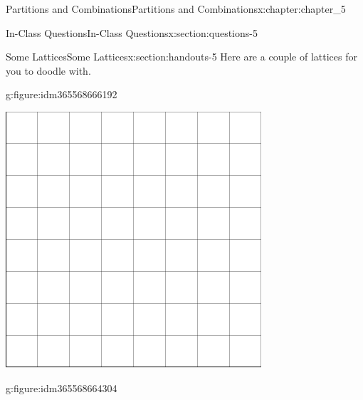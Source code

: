 \documentclass[oneside,10pt,]{book}
\numberwithin{equation}{section}
\begin{document}
\begin{chapterptx}{Partitions and Combinations}{}{Partitions and Combinations}{}{}{x:chapter:chapter_5}
\begin{sectionptx}{In-Class Questions}{}{In-Class Questions}{}{}{x:section:questions-5}
\begin{enumerate}[label=\arabic*.]
\end{enumerate}
%
\end{sectionptx}
%
%
\typeout{************************************************}
\typeout{************************************************}
%
\begin{sectionptx}{Some Lattices}{}{Some Lattices}{}{}{x:section:handouts-5}
Here are a couple of lattices for you to doodle with.%
\begin{figureptx}{}{g:figure:idm365568666192}{}%
\begin{image}{0.125}{0.75}{0.125}%
\includegraphics[width=\linewidth]{images/graphpaper8.png}
\end{image}%
\tcblower
\end{figureptx}%
\begin{figureptx}{}{g:figure:idm365568664304}{}%
\begin{image}{0.125}{0.75}{0.125}%

\end{image}
\end{figureptx}
\end{sectionptx}
\end{chapterptx}
\end{document}
